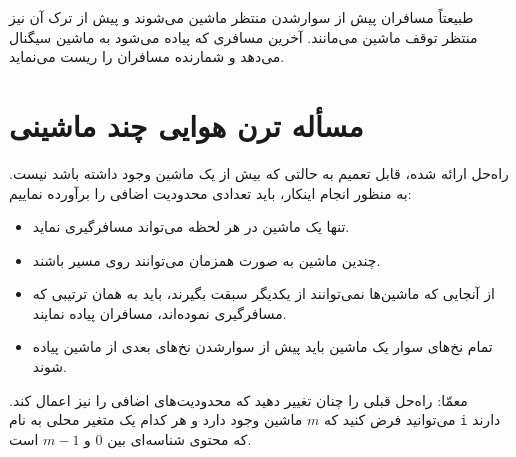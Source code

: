 \documentclass{book}
\newcommand{\clearemptydoublepage}{\newpage\cleardoublepage}
\begin{document}
    طبیعتاً مسافران پیش از سوارشدن منتظر ماشین می‌شوند و پیش از ترک آن نیز منتظر توقف ماشین می‌مانند. 
    آخرین مسافری که پیاده می‌شود به ماشین سیگنال می‌دهد و شمارنده مسافران را ریست می‌نماید. 


\clearemptydoublepage
\section{مسأله ترن هوایی چند ماشینی}

    راه‌حل ارائه شده، قابل تعمیم به حالتی که بیش از یک ماشین وجود داشته باشد نیست. به منظور انجام اینکار، باید تعدادی محدودیت اضافی را برآورده نماییم:

\begin{itemize}

\item %
    تنها یک ماشین در هر لحظه می‌تواند مسافرگیری نماید.

\item %
    چندین ماشین به صورت همزمان می‌توانند روی مسیر باشند. 

\item %
    از آنجایی که ماشین‌ها نمی‌توانند از یکدیگر سبقت بگیرند، باید به همان ترتیبی که مسافرگیری نموده‌اند، مسافران پیاده نمایند. 

\item %
    تمام نخ‌های سوار یک ماشین باید پیش از سوارشدن نخ‌های بعدی از ماشین پیاده شوند.
\end{itemize}

    معمّا: راه‌حل قبلی را چنان تغییر دهید که محدودیت‌های اضافی را نیز اعمال کند. 
    می‌توانید فرض کنید که  $m$ ماشین وجود دارد و هر کدام یک متغیر محلی به نام {\tt i} دارند که محتوی شناسه‌‌ای بین 0 و  $m-1$ است. 
\end{document}
